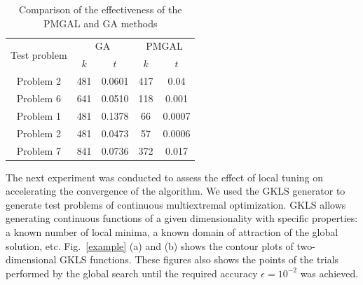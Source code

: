 \documentclass[
11pt,%
tightenlines,%
twoside,%
onecolumn,%
nofloats,%
nobibnotes,%
nofootinbib,%
superscriptaddress,%
noshowpacs,%
centertags]%
{revtex4}
\begin{document}
\begin{table}[ht]
	\caption{Comparison of the effectiveness of the PMGAL and GA methods}
	\label{tab:1}
	\center
	\begin{tabular}{|c|c|c|c|c|}
		\hline
	\multirow{2}{*}{Test problem}	 & \multicolumn{2}{c|}{ GA } &  \multicolumn{2}{c|}{PMGAL} \\
		\cline{2-3} \cline{4-5} 
		 & $k$ & $t$ &  $k$ & $t$  \\
		\hline 
		 Problem 2 \cite{Floudas}&	481 &	0.0601 & 	417 &	0.04 \\
		 Problem 6 \cite{Floudas}&	641 &	0.0510 & 	118 &	0.001 \\
		 Problem 1 \cite{Deep}   &	481 &	0.1378 & 	66 &	0.0007 \\
		 Problem 2 \cite{Deep}   &	481 &	0.0473 & 	57 &	0.0006 \\
		 Problem 7 \cite{Deep}   &	841 &	0.0736 &  372	 &	0.017 \\
		\hline
	\end{tabular}
\end{table}	


The next experiment was conducted to assess the effect of local tuning on accelerating the convergence of the algorithm. We used the GKLS generator \cite{Gaviano} to generate test problems of continuous multiextremal optimization. GKLS allows generating continuous functions of a given dimensionality with specific properties: a known number of local minima, a known domain of attraction of the global solution, etc.  
Fig.~\ref{example} (a) and (b) shows the contour plots of two-dimensional GKLS functions. These figures also shows the points of the trials performed by the global search until the required accuracy $\epsilon=10^{-2}$ was achieved.
\end{document}

